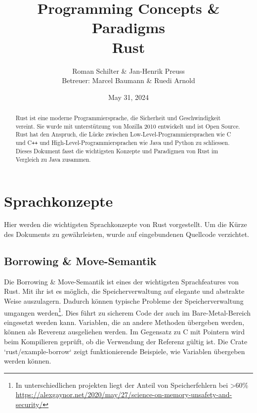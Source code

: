 \documentclass[letterpaper,12pt]{article}
\begin{document}
    \title{Programming Concepts \& Paradigms\\Rust}
    \author{Roman Schilter \& Jan-Henrik Preuss\\[0.4cm]{\small Betreuer: Marcel Baumann \& Ruedi Arnold}}
    \date{May 31, 2024}
    \maketitle


    \begin{abstract}
        Rust ist eine moderne Programmiersprache, die Sicherheit und Geschwindigkeit vereint.
        Sie wurde mit unterstützung von Mozilla 2010 entwickelt und ist Open Source.
        Rust hat den Anspruch, die Lücke zwischen Low-Level-Programmiersprachen wie C und C\texttt{++} und High-Level-Programmiersprachen wie Java und Python zu schliessen.
        Dieses Dokument fasst die wichtigsten Konzepte und Paradigmen von Rust im Vergleich zu Java zusammen.
    \end{abstract}



    \section{Sprachkonzepte}

    Hier werden die wichtigsten Sprachkonzepte von Rust vorgestellt.
    Um die Kürze des Dokuments zu gewährleisten, wurde auf eingebundenen Quellcode verzichtet.

    \subsection{Borrowing \& Move-Semantik}\label{subsec:borrowing-&-move-semantik}
    Die Borrowing \& Move-Semantik ist eines der wichtigsten Sprachfeatures von Rust.
    Mit ihr ist es möglich, die Speicherverwaltung auf elegante und abstrakte Weise auszulagern.
    Dadurch können typische Probleme der Speicherverwaltung umgangen werden\footnote
    {In unterschiedlichen projekten liegt der Anteil von Speicherfehlern bei \textgreater 60\% \url{https://alexgaynor.net/2020/may/27/science-on-memory-unsafety-and-security/}}.
    Dies führt zu sicherem Code der auch im Bare-Metal-Bereich eingesetzt werden kann.
    Variablen, die an andere Methoden übergeben werden, können als Reverenz ausgeliehen werden.
    Im Gegensatz zu C mit Pointern wird beim Kompilieren geprüft, ob die Verwendung der Referenz gültig ist.
    Die Crate `rust/example-borrow` zeigt funktionierende Beispiele, wie Variablen übergeben werden können.
\end{document}
